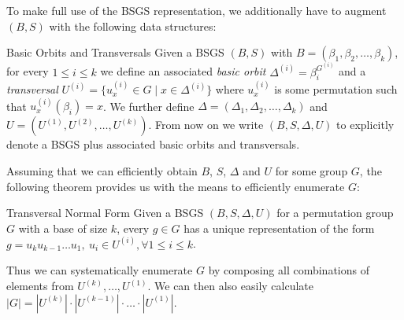 To make full use of the BSGS representation, we additionally have to augment
$(B, S)$ with the following data structures:

\begin{defn}{Basic Orbits and Transversals}
  Given a BSGS $(B, S)$ with $B = (\beta_1, \beta_2, \dots, \beta_k)$, for
  every $1 \leq i \leq k$ we define an associated \textit{basic orbit}
  $\Delta^{(i)} = \beta_i^{G^{(i)}}$ and a \textit{transversal} $U^{(i)} =
  \{u_x^{(i)} \in G \mid x \in \Delta^{(i)}\}$ where $u_x^{(i)}$ is some
  permutation such that $u_x^{(i)}(\beta_i) = x$. We further define $\Delta =
  (\Delta_1, \Delta_2, \dots, \Delta_k)$ and $U = (U^{(1)}, U^{(2)}, \dots,
  U^{(k)})$. From now on we write $(B, S, \Delta, U)$ to explicitly denote a BSGS
  plus associated basic orbits and transversals.
\end{defn}
%
Assuming that we can efficiently obtain $B$, $S$, $\Delta$ and $U$ for some
group $G$, the following theorem provides us with the means to efficiently
enumerate $G$:

\begin{thm}[label=thm:transversal_normal_form]{Transversal Normal Form}
  Given a BSGS ${(B, S, \Delta, U)}$ for a permutation group $G$ with a base of
  size $k$, every ${g \in G}$ has a unique representation of the form $g = u_k
  u_{k-1} \dots u_1,\ u_i \in U^{(i)}, \forall 1 \leq i \leq k$.
\end{thm}
%
Thus we can systematically enumerate $G$ by composing all combinations of
elements from $U^{(k)}, \dots, U^{(1)}$. We can then also easily calculate $|G|
= |U^{(k)}| \cdot |U^{(k-1)}| \cdot \dots \cdot |U^{(1)}|$.

